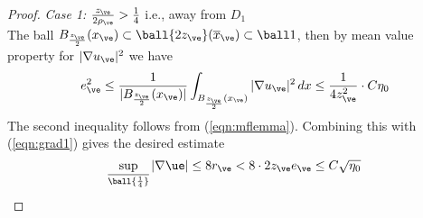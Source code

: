 \begin{proof}
      \textit{Case 1:}   $ \frac{z_\ve}{2\rho_\ve} > \frac{1}{4}$ i.e., away from  $D_1$\\
           The ball $B_{\frac{z_\ve}{2}}(x_\ve) \subset \ball {2z_\ve}(\overline{x}_\ve) \subset \ball 1 $, then by mean value property for $|\nabla u_\ve|^2$ we have 
        \begin{equation} \label{eqn:case1}
            e_\ve ^2 \leq \frac{1}{|B_{\frac{z_\ve}{2}}(x_\ve)|}\int_{B_{\frac{z_\ve}{2}}(x_\ve)} |\nabla u_\ve|^2 \,dx 
                    \leq \frac{1}{4z_{\ve}^2}\cdot C\eta_0  
        \end{equation}
        The second inequality follows from (\ref{eqn:mflemma}). Combining this with (\ref{eqn:grad1}) gives the desired estimate
        $$ \sup_{\overline{\ball {\frac{1}{4}}}} |\nabla \ue| \leq 8 r_\ve < 8\cdot  2z_\ve e_\ve \leq C\sqrt{\eta_0} $$   



\end{proof}
